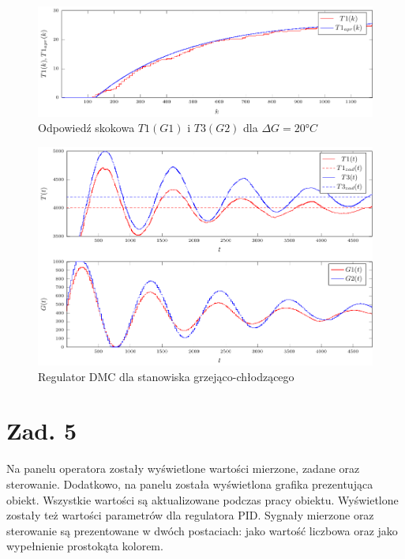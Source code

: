 \documentclass[a4paper,titlepage,11pt,twosides,floatssmall]{mwrep}
\begin{document}
\begin{figure}[]
	\centering
	\includegraphics[scale=1]{../wykresy/zad4_odp1.pdf}
	\caption{Odpowiedź skokowa $T1(G1)$ i $T3(G2)$ dla $\Delta G = 20°C$}
	\label{zad4_odp1}
\end{figure}


\begin{figure}[]
	\centering
	\includegraphics[scale=1]{../wykresy/zad4_dmc.pdf}
	\caption{Regulator DMC dla stanowiska grzejąco-chłodzącego}
	\label{zad4_pid}
\end{figure}


\chapter{Zad. 5}

Na panelu operatora zostały wyświetlone wartości mierzone, zadane oraz sterowanie. Dodatkowo, na panelu została wyświetlona grafika prezentująca obiekt. Wszystkie wartości są aktualizowane podczas pracy obiektu. Wyświetlone zostały też wartości parametrów dla regulatora PID. Sygnały mierzone oraz sterowanie są prezentowane w dwóch postaciach: jako wartość liczbowa oraz jako wypełnienie prostokąta kolorem.
\end{document}
